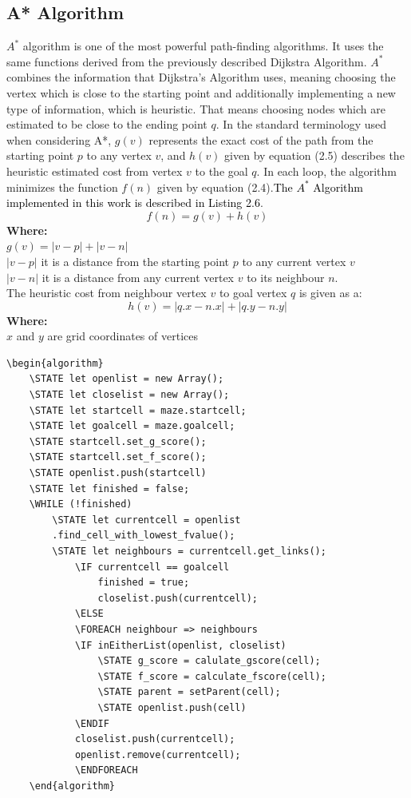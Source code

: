 \subsection{A* Algorithm}
$A^*$ algorithm is one of the most powerful path-finding algorithms. It uses the same functions derived from the previously described Dijkstra Algorithm. 
$A^*$ combines the information that Dijkstra’s Algorithm uses, meaning choosing the vertex which is close to the starting point and additionally
implementing a new type of information, which is heuristic. That means choosing nodes which are estimated to be close to the ending point $q$. 
In the standard terminology used when considering A*, $g(v)$ represents the exact cost of the path from the starting point $p$ to any vertex $v$, and
$h(v)$ given by equation (2.5) describes the heuristic estimated cost from vertex $v$ to the goal $q$. In each loop, the algorithm minimizes the function
$f(n)$ given by equation (2.4).\textcolor{black}{The $A^*$ Algorithm implemented in this work is described in Listing 2.6}.
\begin{equation}
f(n) = g(v) + h(v)
\end{equation}
\textbf{Where:}\\
$g(v)= |v - p| + |v - n|$\\
$|v - p|$ it is a distance from the starting point $p$ to any current vertex $v$\\
$|v - n|$ it is a distance from any current vertex $v$ to its neighbour $n$.\\
\newline
The heuristic cost from neighbour vertex $v$ to goal vertex $q$ is given as a:
\begin{equation}
h(v) = |q.x - n.x| + |q.y - n.y|
\end{equation}
\textbf{Where:}\\
$x$ and $y$ are grid coordinates of vertices\\

\begin{lstlisting}[caption={Pseudocode for a A* algorithm}]
	\begin{algorithm}
	\STATE let openlist = new Array();
	\STATE let closelist = new Array();
	\STATE let startcell = maze.startcell;
	\STATE let goalcell = maze.goalcell;
	\STATE startcell.set_g_score();
	\STATE startcell.set_f_score();
	\STATE openlist.push(startcell)
	\STATE let finished = false;
	\WHILE (!finished)
		\STATE let currentcell = openlist    
		.find_cell_with_lowest_fvalue();
		\STATE let neighbours = currentcell.get_links();
			\IF currentcell == goalcell
				finished = true;
				closelist.push(currentcell);
			\ELSE 
			\FOREACH neighbour => neighbours	
			\IF inEitherList(openlist, closelist)
				\STATE g_score = calulate_gscore(cell);
				\STATE f_score = calculate_fscore(cell);
				\STATE parent = setParent(cell);
				\STATE openlist.push(cell)
			\ENDIF
			closelist.push(currentcell);
			openlist.remove(currentcell);
	    	\ENDFOREACH
	\end{algorithm}
	\end{lstlisting}
%